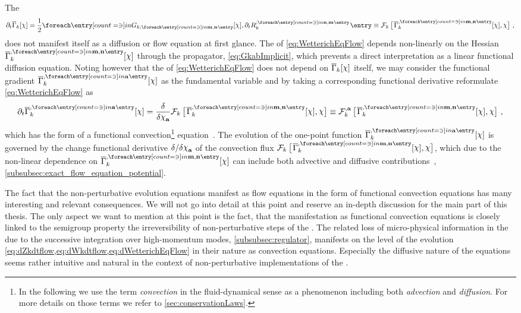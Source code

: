 The \frgEquation{} 
\begin{align}
	\partial_t\FSeaa_k[\FSsf]
	=\frac{1}{2}\ncm{\FSpropagator{\FSidx{m},\FSidx{n}}[\FSsf],\FSregulatorDt{\FSidx{n},\FSidx{m}}}
	\equiv \FRGflow_k\sbr[1]{\mkern2mu\FSvertex{\FSidx{m},\FSidx{n}}[\FSmf{\FSsf}],\FSsf}\,,\label{eq:WetterichEqFlow}
\end{align}
does not manifest itself as a diffusion or flow equation at first glance. 
The \rhs{} of \cref{eq:WetterichEqFlow} depends non-linearly on the Hessian $\FSvertex{\FSidx{m},\FSidx{n}}[\FSmf{\FSsf}]$ through the propagator, \cf{} \cref{eq:GkabImplicit}, which prevents a direct interpretation as a linear functional diffusion equation.
Noting however that the \rhs{} of \cref{eq:WetterichEqFlow} does not depend on $\FSeaa_k[\FSsf]$ itself, we may consider the functional gradient $\FSvertex{\FSidx{a}}[\FSmf{\FSsf}]$ as the fundamental variable and by taking a corresponding functional derivative reformulate \cref{eq:WetterichEqFlow} as
\begin{align}
	\partial_t \FSvertex{\FSidx{a}}[\FSmf{\FSsf}] = \frac{\delta}{\delta \FSmfd{\FSsf}{a}}\FRGflow_k\sbr[1]{\mkern2mu\FSvertex{\FSidx{m},\FSidx{n}}[\FSmf{\FSsf}],\FSsf}\equiv\FRGflow_k^{,\FSidx{a}}\sbr[1]{\mkern2mu\FSvertex{\FSidx{m},\FSidx{n}}[\FSmf{\FSsf}],\FSsf}\,,
	\label{eq:dWetterichEqFlow}
\end{align}
which has the form of a functional convection\footnote{
	In the following we use the term \textit{convection} in the fluid-dynamical sense as a phenomenon including both \textit{advection} and \textit{diffusion}.
	For more details on those terms we refer to \cref{sec:conservationLaws}.%
} equation~\cite{Koenigstein:2021syz,Grossi:2019urj}.
The \rgtime{} evolution of the one-point function $\FSvertex{\FSidx{a}}[\FSmf{\FSsf}]$ is governed by the change \dash{} functional derivative $\delta/\delta \FSmfd{\FSsf}{a}$ \dash{} of the convection flux $\FRGflow_k\sbr[1]{\mkern2mu\FSvertex{\FSidx{m},\FSidx{n}}[\FSmf{\FSsf}],\FSsf}$, which due to the non-linear dependence on $\FSvertex{\FSidx{m},\FSidx{n}}[\FSmf{\FSsf}]$ can include both advective and diffusive contributions~\cite{Koenigstein:2021syz,Grossi:2019urj}, \cf{} \cref{subsubsec:exact_flow_equation_potential}.\bigskip

The fact that the non-perturbative \rg{} evolution equations manifest as flow equations in the form of functional convection equations has many interesting and relevant consequences.
We will not go into detail at this point and reserve an in-depth discussion for the main part of this thesis.
The only aspect we want to mention at this point is the fact, that the manifestation as functional convection equations is closely linked to the semigroup property \dash{} the irreversibility of non-perturbative \rg{} steps \dash{} of the \grg{}.
The related loss of micro-physical information in the \grg{} due to the successive integration over high-momentum modes, \cf{} \cref{subsubsec:regulator}, manifests on the level of the evolution \cref{eq:dZkdtflow,eq:dWkdtflow,eq:dWetterichEqFlow} in their nature as convection equations.
Especially the diffusive nature of the equations seems rather intuitive and natural in the context of non-perturbative implementations of the \rg{}.

